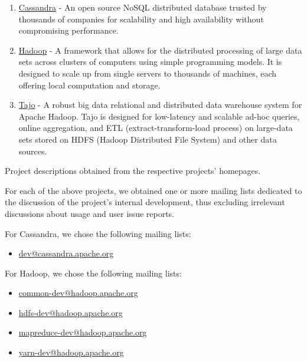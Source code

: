 \documentclass[a4paper, 12pt]{article}
\begin{document}
		\begin{enumerate}
			\item \href{https://cassandra.apache.org}{Cassandra} - An open source NoSQL distributed database trusted by thousands of companies for scalability and high availability without compromising performance.
			\item \href{https://hadoop.apache.org/}{Hadoop} - A framework that allows for the distributed processing of large data sets across clusters of computers using simple programming models. It is designed to scale up from single servers to thousands of machines, each offering local computation and storage.
			\item \href{https://tajo.apache.org/}{Tajo} - A robust big data relational and distributed data warehouse system for Apache Hadoop. Tajo is designed for low-latency and scalable ad-hoc queries, online aggregation, and ETL (extract-transform-load process) on large-data sets stored on HDFS (Hadoop Distributed File System) and other data sources.
		\end{enumerate}
		
		\footnotesize Project descriptions obtained from the respective projects' homepages.
		\normalsize
		
		For each of the above projects, we obtained one or more mailing lists dedicated to the discussion of the project's internal development, thus excluding irrelevant discussions about usage and user issue reports.
		
		For Cassandra, we chose the following mailing lists:
		\begin{itemize}
			\item \href{https://lists.apache.org/list.html?dev@cassandra.apache.org}{dev@cassandra.apache.org}
		\end{itemize}
	
		For Hadoop, we chose the following mailing lists:
		\begin{itemize}
			\item \href{https://lists.apache.org/list.html?common-dev@hadoop.apache.org}{common-dev@hadoop.apache.org}
			\item \href{https://lists.apache.org/list.html?hdfs-dev@hadoop.apache.org}{hdfs-dev@hadoop.apache.org}
			\item \href{https://lists.apache.org/list.html?mapreduce-dev@hadoop.apache.org}{mapreduce-dev@hadoop.apache.org}
			\item \href{https://lists.apache.org/list.html?yarn-dev@hadoop.apache.org}{yarn-dev@hadoop.apache.org}
		\end{itemize}
	
\end{document}
